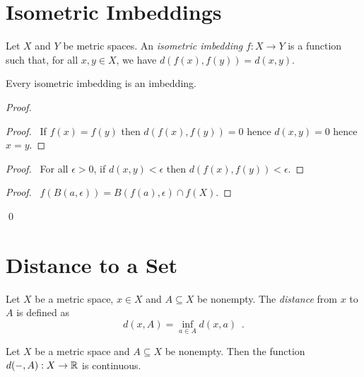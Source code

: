 \section{Isometric Imbeddings}

\begin{definition}
    Let $X$ and $Y$ be metric spaces. An \emph{isometric imbedding} $f : X \rightarrow Y$ is a function such that, for all $x, y \in X$, we have $d(f(x),f(y)) = d(x,y)$.
\end{definition}

\begin{proposition}
    \label{proposition:isometric_imbedding}
    Every isometric imbedding is an imbedding.
\end{proposition}

\begin{proof}
    \pf
    \begin{proof}
        \pf\ If $f(x) = f(y)$ then $d(f(x),f(y)) = 0$ hence $d(x,y) = 0$ hence $x = y$.
    \end{proof}
    \begin{proof}
        \pf\ For all $\epsilon > 0$, if $d(x,y) < \epsilon$ then $d(f(x),f(y)) < \epsilon$.
    \end{proof}
    \begin{proof}
        \pf\ $f(B(a,\epsilon)) = B(f(a),\epsilon) \cap f(X)$.
    \end{proof}
    \qed
\end{proof}

\section{Distance to a Set}

\begin{definition}
    Let $X$ be a metric space, $x \in X$ and $A \subseteq X$ be nonempty. The \emph{distance} from $x$ to $A$ is defined as
    \[ d(x,A) = \inf_{a \in A} d(x,a) \enspace . \]
\end{definition}

\begin{proposition}
    \label{proposition:distance_continuous}
    Let $X$ be a metric space and $A \subseteq X$ be nonempty. Then the function
    $d(-,A) : X \rightarrow \mathbb{R}$ is continuous.
\end{proposition}

